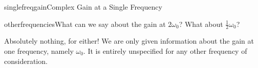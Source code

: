 \begin{mainquestion}{singlefreqgain}{Complex Gain at a Single Frequency}
\begin{partquestion}{otherfrequencies}{What can we say about the gain at $2\omega_{0}$? What about $\frac{1}{2}\omega_{0}$?}
\begin{answer}
Absolutely nothing, for either! We are only given information about the gain at one frequency, namely $\omega_{0}$. It is entirely unspecified for any other frequency of consideration.
\end{answer}
\end{partquestion}

\end{mainquestion}